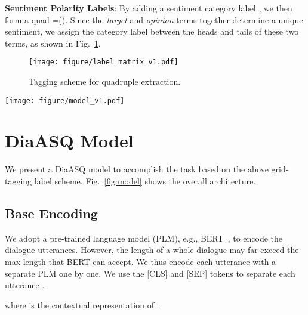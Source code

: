 \documentclass[11pt]{article}
\begin{document}
\vspace{2pt}
 \textbf{Sentiment Polarity Labels}:
By adding a sentiment category label , we then form a quad =().
Since the \emph{target} and \emph{opinion} terms together determine a unique sentiment, we assign the category label between the heads and tails of these two terms, as shown in Fig.~\ref{fig:matrix}.

\begin{figure}[!t]
  \centering
  \texttt{[image: figure/label\_matrix\_v1.pdf]}
  \caption{Tagging scheme for quadruple extraction. }
  \label{fig:matrix}
  \vspace{-4mm}
\end{figure}

\begin{figure*}[!t]
\centering
\texttt{[image: figure/model\_v1.pdf]}
\caption{
The overall framework of our DiaASQ model.
First, the base encoder learns base contextual representations for the input dialogue texts.
The multi-view interaction layer then aggregates dialogue-specific feature representations, such as the threads, speakers, and replying information.
We further fuse the Rotary Position Embedding (RoPE), where the relative dialogue distance information helps guide better discourse understanding. 
Finally, the system decodes all the quadruples based on the grid-tagging labels.
}
\label{fig:model}
\vspace{-5pt}
\end{figure*}

\section{DiaASQ Model}
We present a DiaASQ model to accomplish the task based on the above grid-tagging label scheme.
Fig.~\ref{fig:model} shows the overall architecture.

\subsection{Base Encoding}
We adopt a pre-trained language model (PLM), e.g., BERT~\cite{DevlinCLT19}, to encode the dialogue utterances.
However, the length of a whole dialogue may far exceed the max length that BERT can accept.
We thus encode each utterance with a separate PLM one by one.
We use the [CLS] and [SEP] tokens to separate each utterance .
\setlength\abovedisplayskip{2pt}
\setlength\belowdisplayskip{2pt}

where  is the contextual representation of .
\end{document}
